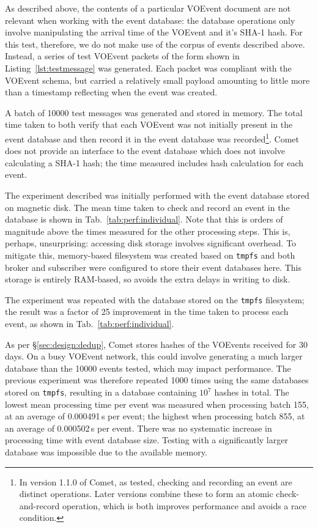 \documentclass[5p,authoryear]{elsarticle}
\begin{document}
As described above, the contents of a particular VOEvent document are not
relevant when working with the event database: the database operations only
involve manipulating the arrival time of the VOEvent and it's SHA-1 hash. For
this test, therefore, we do not make use of the corpus of events described
above. Instead, a series of test VOEvent packets of the form shown in
Listing~\ref{lst:testmessage} was generated.  Each packet was compliant with
the VOEvent schema, but carried a relatively small payload amounting to little
more than a timestamp reflecting when the event was created.

A batch of 10000 test messages was generated and stored in memory. The total
time taken to both verify that each VOEvent was not initially present in the
event database and then record it in the event database was
recorded\footnote{In version 1.1.0 of Comet, as tested, checking and recording
an event are distinct operations. Later versions combine these to form an
atomic check-and-record operation, which is both improves performance and
avoids a race condition.}. Comet does not provide an interface to the event
database which does not involve calculating a SHA-1 hash; the time measured
includes hash calculation for each event.

The experiment described was initially performed with the event database
stored on magnetic disk. The mean time taken to check and record an event in
the database is shown in Tab.~\ref{tab:perf:individual}. Note that this is
orders of magnitude above the times measured for the other processing steps.
This is, perhaps, unsurprising: accessing disk storage involves significant
overhead. To mitigate this, memory-based filesystem was created based on
\texttt{tmpfs} \citep{Kerrisk:2014} and both broker and subscriber were
configured to store their event databases here. This storage is entirely
RAM-based, so avoids the extra delays in writing to disk.

The experiment was repeated with the database stored on the \texttt{tmpfs}
filesystem; the result was a factor of 25 improvement in the time taken to
process each event, as shown in Tab.~\ref{tab:perf:individual}.

As per \S\ref{sec:design:dedup}, Comet stores hashes of the VOEvents received
for 30 days. On a busy VOEvent network, this could involve generating a much
larger database than the 10000 events tested, which may impact performance.
The previous experiment was therefore repeated 1000 times using the same
databases stored on \texttt{tmpfs}, resulting in a database containing $10^7$
hashes in total. The lowest mean processing time per event was measured when
processing batch 155, at an average of 0.000491\,s per event; the highest when
processing batch 855, at an average of 0.000502\,s per event. There was no
systematic increase in processing time with event database size. Testing with
a significantly larger database was impossible due to the available memory.
\end{document}
